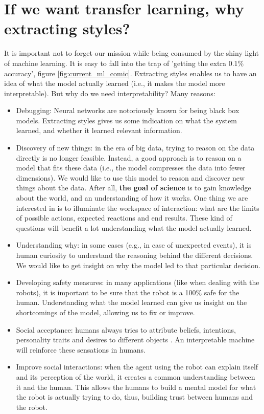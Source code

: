 \section{If we want transfer learning, why extracting styles?}
  \par It is important not to forget our mission while being consumed by the shiny light of machine learning. It is easy to fall into the trap of 'getting the extra 0.1\% accuracy', figure \ref{fig:current_ml_comic}. Extracting styles enables us to have an idea of what the model actually learned (i.e., it makes the model more interpretable). But why do we need interpretability? Many reasons:
  \begin{itemize}
    \item Debugging: Neural networks are notoriously known for being black box models. Extracting styles gives us some indication on what the system learned, and whether it learned relevant information.

    \item Discovery of new things: in the era of big data, trying to reason on the data directly is no longer feasible. Instead, a good approach is to reason on a model that fits these data (i.e., the model compresses the data into fewer dimensions). We would like to use this model to reason and discover new things about the data. After all, \textbf{the goal of science} is to gain knowledge about the world, and an understanding of how it works. One thing we are interested in is to illuminate the workspace of interaction: what are the limits of possible actions, expected reactions and end results. These kind of questions will benefit a lot understanding what the model actually learned.

    \item Understanding why: in some cases (e.g., in case of unexpected events), it is human curiosity to understand the reasoning behind the different decisions. We would like to get insight on why the model led to that particular decision.

    \item Developing safety measures: in many applications (like when dealing with the robots), it is important to be sure that the robot is a 100\% safe for the human. Understanding what the model learned can give us insight on the shortcomings of the model, allowing us to fix or improve.

    \item Social acceptance: humans always tries to attribute beliefs, intentions, personality traits and desires to different objects \citep{heider1944experimental}. An interpretable machine will reinforce these sensations in humans.

    \item Improve social interactions: when the agent using the robot can explain itself and its perception of the world, it creates a common understanding between it and the human. This allows the humans to build a mental model for what the robot is actually trying to do, thus, building trust between humans and the robot.
  \end{itemize}

